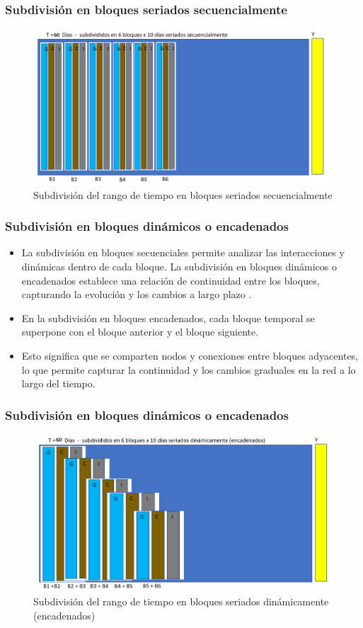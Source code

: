 \documentclass{beamer}
\begin{document}
\begin{frame}
	\frametitle{Subdivisión en bloques seriados secuencialmente}
	\begin{figure}
		\centering
		\includegraphics[width=0.7\linewidth]{figs/imagen20}
		\caption{Subdivisión del rango de tiempo en bloques seriados secuencialmente}
		\label{fig:imagen320}
	\end{figure}
	
\end{frame}


\begin{frame}
	\frametitle{Subdivisión en bloques dinámicos o encadenados}
	\begin{itemize}
		\item La subdivisión en bloques secuenciales permite analizar las interacciones y dinámicas dentro de cada bloque. La subdivisión en bloques dinámicos o encadenados establece una relación de continuidad entre los bloques, capturando la evolución y los cambios a largo plazo \citep{Mahmoud_2021,  tang2010a}.
		\item En la subdivisión en bloques encadenados, cada bloque temporal se superpone con el bloque anterior y el bloque siguiente. 
		\item Esto significa que se comparten nodos y conexiones entre bloques adyacentes, lo que permite capturar la continuidad y los cambios graduales en la red a lo largo del tiempo.
	\end{itemize}	
\end{frame}

\begin{frame}
	\frametitle{Subdivisión en bloques dinámicos o encadenados}
	\begin{figure}[H]
		\centering
		\includegraphics[width=0.7\linewidth]{figs/imagen21}
		\caption{Subdivisión del rango de tiempo en bloques seriados dinámicamente (encadenados)}
		\label{fig:imagen321}
	\end{figure}
	
\end{frame}
\end{document}
